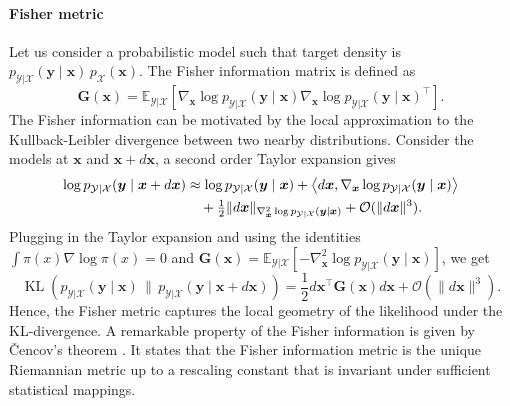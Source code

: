 \paragraph{Fisher metric}
Let us consider a probabilistic model such that target density is $p_{\mathcal{Y}|\mathcal{X}}(\boldsymbol{y}\mid\boldsymbol{x})\,p_{\mathcal{X}}(\boldsymbol{x})$.
The Fisher information matrix \citep{fisher1925theory, amari2000methods} is defined as 
\begin{equation}
 \mathbf{G}(\boldsymbol{x}) = \mathbb{E}_{\mathcal{Y}|\mathcal{X}}\left[ \nabla_{\boldsymbol{x}} \log p_{\mathcal{Y}|\mathcal{X}}(\boldsymbol{y}\mid\boldsymbol{x})
 \nabla_{\boldsymbol{x}} \log p_{\mathcal{Y}|\mathcal{X}}(\boldsymbol{y}\mid\boldsymbol{x}) ^\top
 \right]. \label{eq:fisher_information_metric}
\end{equation}
The Fisher information can be motivated by the local approximation to the Kullback-Leibler divergence between two nearby distributions. Consider the models at $\boldsymbol{x}$ and $\boldsymbol{x}+d\boldsymbol{x}$, a second order Taylor expansion gives
\begin{equation*}
\begin{aligned}
\log p_{\mathcal{Y}|\mathcal{X}}(\boldsymbol{y}\mid\boldsymbol{x} + d\boldsymbol{x})
&\approx \log p_{\mathcal{Y}|\mathcal{X}}(\boldsymbol{y}\mid\boldsymbol{x})
+ \left\langle  d\boldsymbol{x} ,  \nabla_{\boldsymbol{x}} \log p_{\mathcal{Y}|\mathcal{X}}(\boldsymbol{y}\mid\boldsymbol{x})  \right\rangle \\
&\quad + \tfrac{1}{2} \|d\boldsymbol{x}\|_{ \nabla^2_{\boldsymbol{x}} \log p_{\mathcal{Y}|\mathcal{X}}(\boldsymbol{y}\mid\boldsymbol{x}) }
+ \mathcal{O}(\| d\boldsymbol{x} \|^3).
\end{aligned}
\end{equation*}
Plugging in the Taylor expansion and using the identities $\int \pi(x) \nabla \log \pi(x) =0$ and 
$\mathbf{G}(\boldsymbol{x}) = \mathbb{E}_{\mathcal{Y}|\mathcal{X}}\left[ -\nabla^2_{\boldsymbol{x}} \log p_{\mathcal{Y}|\mathcal{X}}(\boldsymbol{y}\mid\boldsymbol{x}) \right]$, we get
\begin{equation*}
    \operatorname{KL}(p_{\mathcal{Y}|\mathcal{X}}(\boldsymbol{y}\mid\boldsymbol{x}) \,\|\, p_{\mathcal{Y}|\mathcal{X}}(\boldsymbol{y}\mid\boldsymbol{x} + d\boldsymbol{x}) ) = \frac{1}{2} d\boldsymbol{x}^\top \mathbf{G}(\boldsymbol{x}) d\boldsymbol{x} + \mathcal{O}(\| d\boldsymbol{x}  \| ^3).
\end{equation*}
Hence, the Fisher metric captures the local geometry of the likelihood under the KL-divergence.
A remarkable property of the Fisher information is given by \v{C}encov's theorem \citep{vcencov1982statistical}. It states that the Fisher information metric is the unique Riemannian metric up to a rescaling constant that is invariant under sufficient statistical mappings. 


